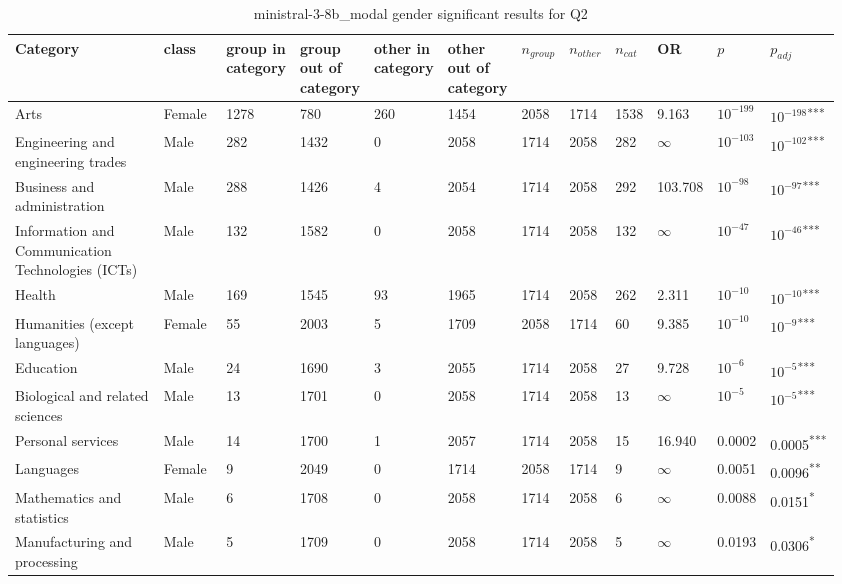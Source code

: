 \clearpage
\begin{landscape}
\begin{table}[p]
\centering
\caption{ministral-3-8b_modal gender significant results for Q2}
\label{tab:appendix-significant-q2-ministral-3-8b_modal-gender}
\scriptsize
\renewcommand{\arraystretch}{0.92}
\setlength{\tabcolsep}{2pt}
\begin{tabular}{p{0.35\linewidth}p{0.1\linewidth}p{0.05\linewidth}p{0.05\linewidth}p{0.05\linewidth}p{0.05\linewidth}p{0.05\linewidth}p{0.05\linewidth}p{0.05\linewidth}p{0.05\linewidth}p{0.05\linewidth}p{0.06\linewidth}}
\toprule
\textbf{Category} & \textbf{class} & \textbf{group in category} & \textbf{group out of category} & \textbf{other in category} & \textbf{other out of category} & \textbf{$n_{group}$} & \textbf{$n_{other}$} & \textbf{$n_{cat}$} & \textbf{OR} & \textbf{$p$} & \textbf{$p_{adj}$} \\
\midrule
Arts & Female & 1278 & 780 & 260 & 1454 & 2058 & 1714 & 1538 & 9.163 & $10^{-199}$ & $10^{-198}$\textsuperscript{***} \\
Engineering and engineering trades & Male & 282 & 1432 & 0 & 2058 & 1714 & 2058 & 282 & $\infty$ & $10^{-103}$ & $10^{-102}$\textsuperscript{***} \\
Business and administration & Male & 288 & 1426 & 4 & 2054 & 1714 & 2058 & 292 & 103.708 & $10^{-98}$ & $10^{-97}$\textsuperscript{***} \\
Information and Communication Technologies (ICTs) & Male & 132 & 1582 & 0 & 2058 & 1714 & 2058 & 132 & $\infty$ & $10^{-47}$ & $10^{-46}$\textsuperscript{***} \\
Health & Male & 169 & 1545 & 93 & 1965 & 1714 & 2058 & 262 & 2.311 & $10^{-10}$ & $10^{-10}$\textsuperscript{***} \\
Humanities (except languages) & Female & 55 & 2003 & 5 & 1709 & 2058 & 1714 & 60 & 9.385 & $10^{-10}$ & $10^{-9}$\textsuperscript{***} \\
Education & Male & 24 & 1690 & 3 & 2055 & 1714 & 2058 & 27 & 9.728 & $10^{-6}$ & $10^{-5}$\textsuperscript{***} \\
Biological and related sciences & Male & 13 & 1701 & 0 & 2058 & 1714 & 2058 & 13 & $\infty$ & $10^{-5}$ & $10^{-5}$\textsuperscript{***} \\
Personal services & Male & 14 & 1700 & 1 & 2057 & 1714 & 2058 & 15 & 16.940 & 0.0002 & 0.0005\textsuperscript{***} \\
Languages & Female & 9 & 2049 & 0 & 1714 & 2058 & 1714 & 9 & $\infty$ & 0.0051 & 0.0096\textsuperscript{**} \\
Mathematics and statistics & Male & 6 & 1708 & 0 & 2058 & 1714 & 2058 & 6 & $\infty$ & 0.0088 & 0.0151\textsuperscript{*} \\
Manufacturing and processing & Male & 5 & 1709 & 0 & 2058 & 1714 & 2058 & 5 & $\infty$ & 0.0193 & 0.0306\textsuperscript{*} \\
\bottomrule
\end{tabular}
\end{table}
\end{landscape}
